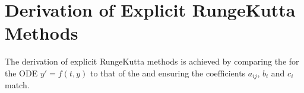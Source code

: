 \documentclass[letterpaper,10pt,english]{jupyterBook}
\begin{document}
\section{Derivation of Explicit Runge\sphinxhyphen{}Kutta Methods}
\label{\detokenize{2_ERKs/2.1_ERK_Derivation:derivation-of-explicit-runge-kutta-methods}}\label{\detokenize{2_ERKs/2.1_ERK_Derivation:rk2-derivation-section}}\label{\detokenize{2_ERKs/2.1_ERK_Derivation::doc}}
\sphinxAtStartPar
The derivation of explicit Runge\sphinxhyphen{}Kutta methods is achieved by comparing the {\hyperref[\detokenize{1_IVPs/1.1_Taylor_Series:taylor-series-section}]{}}  for the ODE \(y'=f(t,y)\) to that of the {\hyperref[\detokenize{2_ERKs/2.0_ERKs:rk-definition}]{}} and ensuring the coefficients \(a_{ij}\), \(b_i\) and \(c_i\) match.
\end{document}
